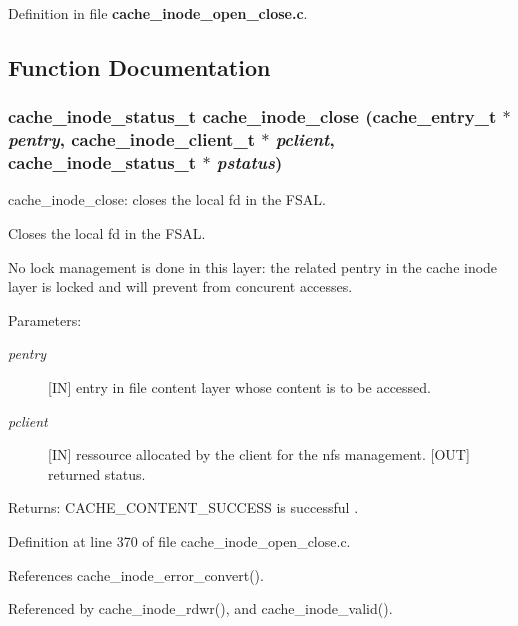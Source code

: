 Definition in file {\bf cache\_\-inode\_\-open\_\-close.c}.

\subsection{Function Documentation}
\subsubsection{\setlength{\rightskip}{0pt plus 5cm}cache\_\-inode\_\-status\_\-t cache\_\-inode\_\-close (cache\_\-entry\_\-t $\ast$ {\em pentry}, cache\_\-inode\_\-client\_\-t $\ast$ {\em pclient}, cache\_\-inode\_\-status\_\-t $\ast$ {\em pstatus})}\label{cache__inode__open__close_8c_a2}


cache\_\-inode\_\-close: closes the local fd in the FSAL.

Closes the local fd in the FSAL.

No lock management is done in this layer: the related pentry in the cache inode layer is locked and will prevent from concurent accesses.

\begin{Desc}
\item[Parameters:]
\begin{description}
\item[{\em pentry}][IN] entry in file content layer whose content is to be accessed. \item[{\em pclient}][IN] ressource allocated by the client for the nfs management.  [OUT] returned status.\end{description}
\end{Desc}
\begin{Desc}
\item[Returns:]CACHE\_\-CONTENT\_\-SUCCESS is successful . \end{Desc}


Definition at line 370 of file cache\_\-inode\_\-open\_\-close.c.

References cache\_\-inode\_\-error\_\-convert().

Referenced by cache\_\-inode\_\-rdwr(), and cache\_\-inode\_\-valid().
